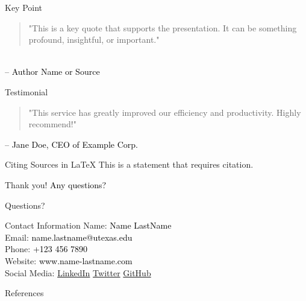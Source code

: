 \documentclass[aspectratio=1610, 12pt]{beamer}
\begin{document}
\begin{frame}{Key Point}
    \begin{quote}
        \textcolor{MainColorTheme}{\large "This is a key quote that supports the presentation. It can be something profound, insightful, or important."}
    \end{quote}
    \hfill \\
    \raggedleft \textcolor{black}{\small -- Author Name or Source}
\end{frame}

\begin{frame}{Testimonial}
    \begin{quote}
        \textcolor{MainColorTheme}{\large "This service has greatly improved our efficiency and productivity. Highly recommend!"}
    \end{quote}
    \vspace{1cm}
    \raggedleft \textcolor{black}{\small -- Jane Doe, CEO of Example Corp.}
\end{frame}



\begin{frame}{Citing Sources in LaTeX}
    This is a statement that requires citation.~\cite{author2023}
\end{frame}

\begin{frame}%
    \vfill
    \centering
    \textcolor{MainColorTheme}{\Huge Thank you!}
    \vfill
    \textcolor{black}{\large Any questions?}
\end{frame}

\begin{frame}[plain]
    \vfill
    \centering
    \textcolor{MainColorTheme}{\Huge Questions?}
    \vfill
\end{frame}


\begin{frame}{Contact Information}
    \textcolor{MainColorTheme}{\large Name:} \textcolor{black}{Name LastName} \\
    \textcolor{MainColorTheme}{\large Email:} \textcolor{black}{name.lastname@utexas.edu} \\
    \textcolor{MainColorTheme}{\large Phone:} \textcolor{black}{+123 456 7890} \\
    \textcolor{MainColorTheme}{\large Website:} \textcolor{black}{www.name-lastname.com} \\
    \vspace{1cm}
    \textcolor{MainColorTheme}{\large Social Media:}
    \textcolor{black}{
        \href{https://www.linkedin.com/in/username}{LinkedIn} \quad
        \href{https://twitter.com/username}{Twitter} \quad
        \href{https://github.com/username}{GitHub}
    }
\end{frame}


\begin{frame}{References}
    \printbibliography
\end{frame}
\end{document}
